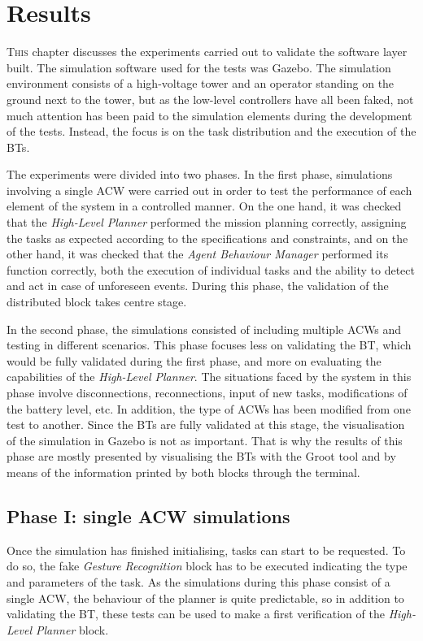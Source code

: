 \chapter{Results}
\label{ch:Results}
\lettrine[lraise=-0.1, lines=2, loversize=0.2]{T}{his} chapter discusses the experiments carried out to validate the software layer built. The simulation software used for the tests was Gazebo. The simulation environment consists of a high-voltage tower and an operator standing on the ground next to the tower, but as the low-level controllers have all been faked, not much attention has been paid to the simulation elements during the development of the tests. Instead, the focus is on the task distribution and the execution of the \glspl{BT}.

The experiments were divided into two phases. In the first phase, simulations involving a single \gls{ACW} were carried out in order to test the performance of each element of the system in a controlled manner. On the one hand, it was checked that the \emph{High-Level Planner} performed the mission planning correctly, assigning the tasks as expected according to the specifications and constraints, and on the other hand, it was checked that the \emph{Agent Behaviour Manager} performed its function correctly, both the execution of individual tasks and the ability to detect and act in case of unforeseen events. During this phase, the validation of the distributed block takes centre stage.

In the second phase, the simulations consisted of including multiple \glspl{ACW} and testing in different scenarios. This phase focuses less on validating the \gls{BT}, which would be fully validated during the first phase, and more on evaluating the capabilities of the \emph{High-Level Planner}. The situations faced by the system in this phase involve disconnections, reconnections, input of new tasks, modifications of the battery level, etc. In addition, the type of \glspl{ACW} has been modified from one test to another. Since the \glspl{BT} are fully validated at this stage, the visualisation of the simulation in Gazebo is not as important. That is why the results of this phase are mostly presented by visualising the \glspl{BT} with the Groot tool and by means of the information printed by both blocks through the terminal. 

\section{Phase I: single \gls{ACW} simulations}
\label{sec:phaseI}
Once the simulation has finished initialising, tasks can start to be requested. To do so, the fake \emph{Gesture Recognition} block has to be executed indicating the type and parameters of the task. As the simulations during this phase consist of a single \gls{ACW}, the behaviour of the planner is quite predictable, so in addition to validating the \gls{BT}, these tests can be used to make a first verification of the \emph{High-Level Planner} block.

